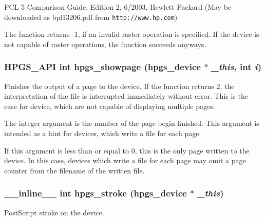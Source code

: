 PCL 5 Comparison Guide, Edition 2, 6/2003, Hewlett Packard (May be downloaded as bpl13206.pdf from {\tt http://www.hp.com})

The function returns -\/1, if an invalid raster operation is specified. If the device is not capable of raster operations, the function succeeds anyways. 
\subsubsection[{hpgs\_\-showpage}]{\setlength{\rightskip}{0pt plus 5cm}HPGS\_\-API int hpgs\_\-showpage ({\bf hpgs\_\-device} $\ast$ {\em \_\-this}, \/  int {\em i})}\label{group__device_gab5845cf069a5d4ca79dfd845e44a0534}
Finishes the output of a page to the device. If the function returns 2, the interpretation of the file is interrupted immediately without error. This is the case for device, which are not capable of displaying multiple pages.

The integer argument is the number of the page begin finished. This argument is intended as a hint for devices, which write a file for each page.

If this argument is less than or equal to 0, this is the only page written to the device. In this case, devices which write a file for each page may omit a page counter from the filename of the written file. 
\subsubsection[{hpgs\_\-stroke}]{\setlength{\rightskip}{0pt plus 5cm}\_\-\_\-inline\_\-\_\- int hpgs\_\-stroke ({\bf hpgs\_\-device} $\ast$ {\em \_\-this})\hspace{0.3cm}{\ttfamily  [static]}}\label{group__device_ga446e8ce0815e9a34c92b87c76c9e1236}
PostScript stroke on the device. 